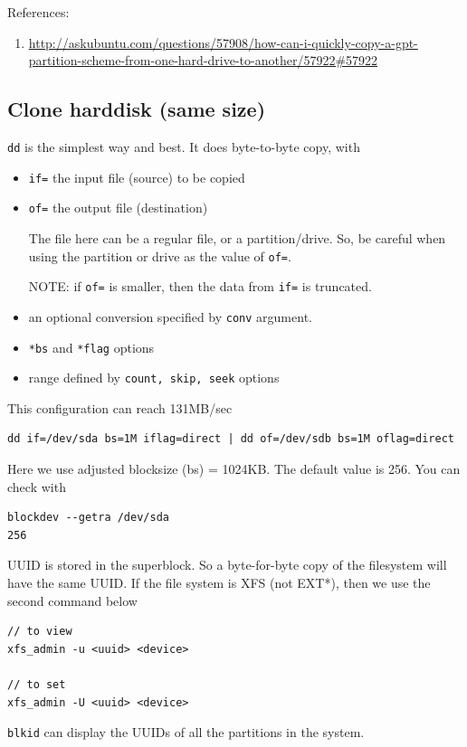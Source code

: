 References:
\begin{enumerate}
  \item
  \url{http://askubuntu.com/questions/57908/how-can-i-quickly-copy-a-gpt-partition-scheme-from-one-hard-drive-to-another/57922#57922}
\end{enumerate}

\subsection{Clone harddisk (same size)}
\label{sec:disk_clone}

\verb!dd! is the simplest way and best. It does byte-to-byte copy, with 
\begin{itemize}
  \item \verb!if=! the input file (source) to be copied
  \item \verb!of=! the output file (destination)

The file here can be a regular file, or a partition/drive. So, be careful when
using the partition or drive as the value of \verb!of=!.

NOTE: if \verb!of=! is smaller, then the data from \verb!if=! is truncated.

  \item  an optional conversion specified by \verb!conv! argument.
  \item  \verb!*bs! and \verb!*flag! options
  \item range defined by \verb!count, skip, seek! options
\end{itemize}


This configuration can reach 131MB/sec
\begin{verbatim}
dd if=/dev/sda bs=1M iflag=direct | dd of=/dev/sdb bs=1M oflag=direct
\end{verbatim}
Here we use adjusted blocksize (bs) = 1024KB. The default value is 256. You
can check with
\begin{verbatim}
blockdev --getra /dev/sda
256
\end{verbatim}

\begin{mdframed}
UUID is stored in the superblock. So a byte-for-byte copy of the filesystem will
have the same UUID. If the file system is XFS (not EXT*), then we use the second
command below
\begin{verbatim}
// to view
xfs_admin -u <uuid> <device>

// to set
xfs_admin -U <uuid> <device>
\end{verbatim}

\verb!blkid! can display the UUIDs of all the partitions in the system.
\end{mdframed}

